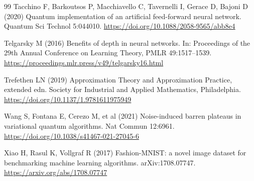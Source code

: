\documentclass[pdflatex,sn-mathphys,NameDate,iicol]{sn-jnl}
\begin{document}
\begin{thebibliography}{99}
Tacchino F, Barkoutsos P, Macchiavello C, Tavernelli I, Gerace D, Bajoni D
(2020) Quantum implementation of an artificial feed-forward neural network.
Quantum Sci Technol 5:044010.
\url{https://doi.org/10.1088/2058-9565/abb8e4}

Telgarsky M (2016) Benefits of depth in neural networks. In: Proceedings of
the 29th Annual Conference on Learning Theory, PMLR 49:1517--1539.
\url{https://proceedings.mlr.press/v49/telgarsky16.html}

Trefethen LN (2019) Approximation Theory and Approximation Practice,
extended edn. Society for Industrial and Applied Mathematics, Philadelphia.
\url{https://doi.org/10.1137/1.9781611975949}

Wang S, Fontana E, Cerezo M, et al (2021) Noise-induced barren plateaus in
variational quantum algorithms. Nat Commun 12:6961.
\url{https://doi.org/10.1038/s41467-021-27045-6}

Xiao H, Rasul K, Vollgraf R (2017) Fashion-MNIST: a novel image dataset for
benchmarking machine learning algorithms. arXiv:1708.07747.
\url{https://arxiv.org/abs/1708.07747}

\end{thebibliography}
\end{document}
